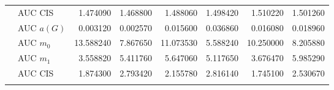 \begin{table}[htbp]
\begin{tabular}{llrrrrrr}
    & AUC CIS & 1.474090 & 1.468800 & 1.488060 & 1.498420 & 1.510220 & 1.501260 \\
    \addlinespace
    \multirow{4}{*}{random} & AUC $a(G)$ & 0.003120 & 0.002570 & 0.015600 & 0.036860 & 0.016080 & 0.018960 \\
    & AUC $m_0$ & 13.588240 & 7.867650 & 11.073530 & 5.588240 & 10.250000 & 8.205880 \\
    & AUC $m_1$ & 3.558820 & 5.411760 & 5.647060 & 5.117650 & 3.676470 & 5.985290 \\
    & AUC CIS & 1.874300 & 2.793420 & 2.155780 & 2.816140 & 1.745100 & 2.530670 \\
    \addlinespace
    \bottomrule
  \end{tabular}
\end{table}

